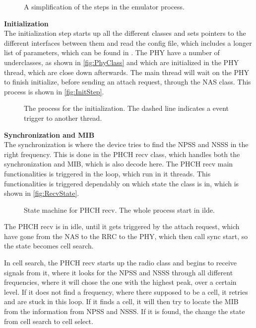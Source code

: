 \begin{figure}[H]
\centering
{}
\resizebox{0.5\textwidth}{!}{
}
\caption{A simplification of the steps in the emulator process.}
\label{fig:MassStep}
\end{figure}

\textbf{Initialization} \\
The initialization step starts up all the different classes and sets pointers to the different interfaces between them and read the config file, which includes a longer list of parameters, which can be found in . The PHY have a number of underclasses, as shown in \autoref{fig:PhyClass} and which are initialized in the PHY thread, which are close down afterwards. The main thread will wait on the PHY to finish initialize, before sending an attach request, through the NAS class. This process is shown in \autoref{fig:InitStep}.

\begin{figure}[H]
\centering
{}
\resizebox{0.5\textwidth}{!}{
}
\caption{The process for the initialization. The dashed line indicates a event trigger to another thread.}
\label{fig:InitStep}
\end{figure}


\textbf{Synchronization and MIB} \\
The synchronization is where the device tries to find the NPSS and NSSS in the right frequency. This is done in the PHCH recv class, which handles both the synchronization and MIB, which is also decode here. The PHCH recv main functionalities is triggered in the loop, which run in it threads. This functionalities is triggered dependably on which state the class is in, which is shown in \autoref{fig:RecvState}.

\begin{figure}[H]
\centering
{}
\resizebox{0.5\textwidth}{!}{
}
\caption{State machine for PHCH recv. The whole process start in ilde.}
\label{fig:RecvState}
\end{figure}


The PHCH recv is in idle, until it gets triggered by the attach request, which have gone from the NAS to the RRC to the PHY, which then call sync start, so the state becomes cell search.

In cell search, the PHCH recv starts up the radio class and begins to receive signals from it, where it looks for the NPSS and NSSS through all different frequencies, where it will chose the one with the highest peak, over a certain level. If it does not find a frequency, where there supposed to be a cell, it retries and are stuck in this loop. If it finds a cell, it will then try to locate the MIB from the information from NPSS and NSSS. If it is found, the change the state from cell search to cell select.

